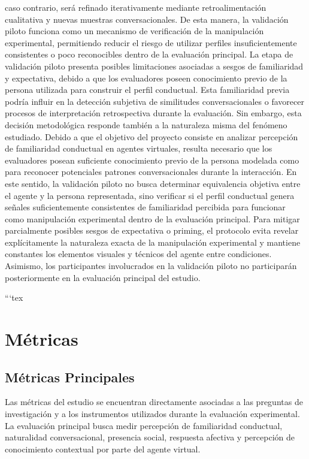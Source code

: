 \documentclass[12pt]{article}
\begin{document}
caso contrario, será refinado iterativamente mediante retroalimentación cualitativa y nuevas muestras conversacionales. De esta manera, la validación piloto funciona como un mecanismo de verificación de la manipulación experimental, permitiendo reducir el riesgo de utilizar perfiles insuficientemente consistentes o poco reconocibles dentro de la evaluación principal. La etapa de validación piloto presenta posibles limitaciones asociadas a sesgos de familiaridad y expectativa, debido a que los evaluadores poseen conocimiento previo de la persona utilizada para construir el perfil conductual. Esta familiaridad previa podría influir en la detección subjetiva de similitudes conversacionales o favorecer procesos de interpretación retrospectiva durante la evaluación. Sin embargo, esta decisión metodológica responde también a la naturaleza misma del fenómeno estudiado. Debido a que el objetivo del proyecto consiste en analizar percepción de familiaridad conductual en agentes virtuales, resulta necesario que los evaluadores posean suficiente conocimiento previo de la persona modelada como para reconocer potenciales patrones conversacionales durante la interacción. En este sentido, la validación piloto no busca determinar equivalencia objetiva entre el agente y la persona representada, sino verificar si el perfil conductual genera señales suficientemente consistentes de familiaridad percibida para funcionar como manipulación experimental dentro de la evaluación principal. Para mitigar parcialmente posibles sesgos de expectativa o priming, el protocolo evita revelar explícitamente la naturaleza exacta de la manipulación experimental y mantiene constantes los elementos visuales y técnicos del agente entre condiciones. Asimismo, los participantes involucrados en la validación piloto no participarán posteriormente en la evaluación principal del estudio.



```tex
\section{Métricas}

\subsection{Métricas Principales}

Las métricas del estudio se encuentran directamente asociadas a las preguntas de investigación y a los instrumentos utilizados durante la evaluación experimental. La evaluación principal busca medir percepción de familiaridad conductual, naturalidad conversacional, presencia social, respuesta afectiva y percepción de conocimiento contextual por parte del agente virtual.
\end{document}
